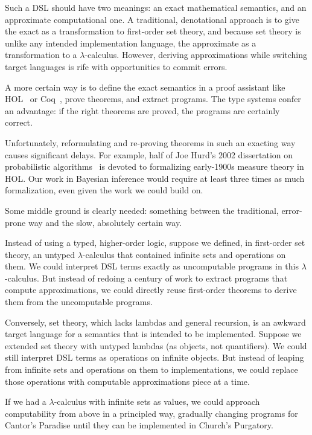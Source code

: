 Such a DSL should have two meanings: an exact mathematical semantics, and an approximate computational one. A traditional, denotational approach is to give the exact as a transformation to first-order set theory, and because set theory is unlike any intended implementation language, the approximate as a transformation to a $\lambda$-calculus. However, deriving approximations while switching target languages is rife with opportunities to commit errors.

A more certain way is to define the exact semantics in a proof assistant like HOL~\cite{leivant-1994-hol} or Coq~\cite{cit:book-coqart}, prove theorems, and extract programs. The type systems confer an advantage: if the right theorems are proved, the programs are certainly correct.

Unfortunately, reformulating and re-proving theorems in such an exacting way causes significant delays. For example, half of Joe Hurd's 2002 dissertation on probabilistic algorithms~\cite{cit:hurd-2002thesis} is devoted to formalizing early-1900s measure theory in HOL. Our work in Bayesian inference would require at least three times as much formalization, even given the work we could build on.

Some middle ground is clearly needed: something between the traditional, error-prone way and the slow, absolutely certain way.

Instead of using a typed, higher-order logic, suppose we defined, in first-order set theory, an untyped $\lambda$-calculus that contained infinite sets and operations on them. We could interpret DSL terms exactly as uncomputable programs in this $\lambda$-calculus. But instead of redoing a century of work to extract programs that compute approximations, we could directly reuse first-order theorems to derive them from the uncomputable programs.

Conversely, set theory, which lacks lambdas and general recursion, is an awkward target language for a semantics that is intended to be implemented. Suppose we extended set theory with untyped lambdas (as objects, not quantifiers). We could still interpret DSL terms as operations on infinite objects. But instead of leaping from infinite sets and operations on them to implementations, we could replace those operations with computable approximations piece at a time.

If we had a $\lambda$-calculus with infinite sets as values, we could approach computability from above in a principled way, gradually changing programs for Cantor's Paradise until they can be implemented in Church's Purgatory.

